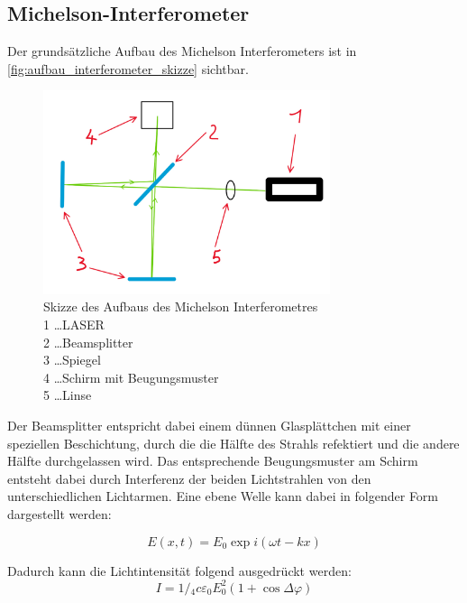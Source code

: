 \documentclass[12pt,english,ngerman]{scrartcl}
\begin{document}
\subsection{Michelson-Interferometer}

Der grundsätzliche Aufbau des Michelson Interferometers ist in
\autoref{fig:aufbau_interferometer_skizze} sichtbar.

\begin{figure}[H]
	\begin{center}
		\includegraphics[width =0.75\textwidth]{./figures/aufbau_interferometer_skizze.jpg}
	\end{center}
	\caption[Skizze des Aufbaus des Michelson Interferometres] {Skizze des Aufbaus des
		Michelson Interferometres         \\
		1 \dots LASER                     \\
		2 \dots Beamsplitter              \\
		3 \dots Spiegel                   \\
		4 \dots Schirm mit Beugungsmuster \\
		5 \dots Linse
	}\label{fig:aufbau_interferometer_skizze}
\end{figure}

Der Beamsplitter entspricht dabei einem dünnen Glasplättchen mit einer
speziellen Beschichtung, durch die die Hälfte des Strahls refektiert und die
andere Hälfte durchgelassen wird. Das entsprechende Beugungsmuster am Schirm
entsteht dabei durch Interferenz der beiden Lichtstrahlen von den
unterschiedlichen Lichtarmen. Eine ebene Welle kann dabei in folgender Form
dargestellt werden:

\begin{equation}
	E(x, t)=E_0 \exp i(\omega t-k x)
\end{equation}

Dadurch kann die Lichtintensität folgend ausgedrückt werden:
\begin{equation}
	I=1 /{ }_4 c \varepsilon_0 E_0^2(1+\cos \Delta \varphi)
\end{equation}
\end{document}
